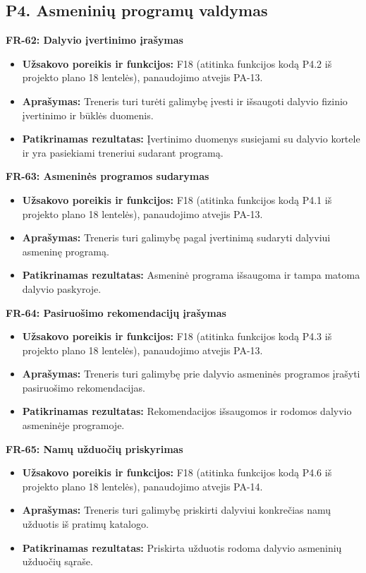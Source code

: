 \subsection{P4. Asmeninių programų valdymas}

\vspace{0.3cm}
\noindent\textbf{FR-62: Dalyvio įvertinimo įrašymas}
\begin{itemize}
    \item \textbf{Užsakovo poreikis ir funkcijos:} F18 (atitinka funkcijos kodą P4.2 iš projekto plano 18 lentelės), panaudojimo atvejis PA-13.
    \item \textbf{Aprašymas:} Treneris turi turėti galimybę įvesti ir išsaugoti dalyvio fizinio įvertinimo ir būklės duomenis.
    \item \textbf{Patikrinamas rezultatas:} Įvertinimo duomenys susiejami su dalyvio kortele ir yra pasiekiami treneriui sudarant programą.
\end{itemize}

\vspace{0.3cm}
\noindent\textbf{FR-63: Asmeninės programos sudarymas}
\begin{itemize}
    \item \textbf{Užsakovo poreikis ir funkcijos:} F18 (atitinka funkcijos kodą P4.1 iš projekto plano 18 lentelės), panaudojimo atvejis PA-13.
    \item \textbf{Aprašymas:} Treneris turi galimybę pagal įvertinimą sudaryti dalyviui asmeninę programą.
    \item \textbf{Patikrinamas rezultatas:} Asmeninė programa išsaugoma ir tampa matoma dalyvio paskyroje.
\end{itemize}

\vspace{0.3cm}
\noindent\textbf{FR-64: Pasiruošimo rekomendacijų įrašymas}
\begin{itemize}
    \item \textbf{Užsakovo poreikis ir funkcijos:} F18 (atitinka funkcijos kodą P4.3 iš projekto plano 18 lentelės), panaudojimo atvejis PA-13.
    \item \textbf{Aprašymas:} Treneris turi galimybę prie dalyvio asmeninės programos įrašyti pasiruošimo rekomendacijas.
    \item \textbf{Patikrinamas rezultatas:} Rekomendacijos išsaugomos ir rodomos dalyvio asmeninėje programoje.
\end{itemize}

\vspace{0.3cm}
\noindent\textbf{FR-65: Namų užduočių priskyrimas}
\begin{itemize}
    \item \textbf{Užsakovo poreikis ir funkcijos:} F18 (atitinka funkcijos kodą P4.6 iš projekto plano 18 lentelės), panaudojimo atvejis PA-14.
    \item \textbf{Aprašymas:} Treneris turi galimybę priskirti dalyviui konkrečias namų užduotis iš pratimų katalogo.
    \item \textbf{Patikrinamas rezultatas:} Priskirta užduotis rodoma dalyvio asmeninių užduočių sąraše.
\end{itemize}

